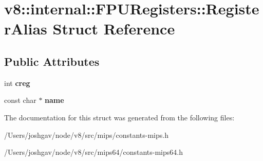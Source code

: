 \hypertarget{structv8_1_1internal_1_1_f_p_u_registers_1_1_register_alias}{}\section{v8\+:\+:internal\+:\+:F\+P\+U\+Registers\+:\+:Register\+Alias Struct Reference}
\label{structv8_1_1internal_1_1_f_p_u_registers_1_1_register_alias}
\subsection*{Public Attributes}
\begin{DoxyCompactItemize}
\item 
int {\bfseries creg}\hypertarget{structv8_1_1internal_1_1_f_p_u_registers_1_1_register_alias_aa9c6ec67f3d8b50d8832cee4fee5eda1}{}\label{structv8_1_1internal_1_1_f_p_u_registers_1_1_register_alias_aa9c6ec67f3d8b50d8832cee4fee5eda1}

\item 
const char $\ast$ {\bfseries name}\hypertarget{structv8_1_1internal_1_1_f_p_u_registers_1_1_register_alias_af7e1a4c08b94dd3b17c3311897eee432}{}\label{structv8_1_1internal_1_1_f_p_u_registers_1_1_register_alias_af7e1a4c08b94dd3b17c3311897eee432}

\end{DoxyCompactItemize}


The documentation for this struct was generated from the following files\+:\begin{DoxyCompactItemize}
\item 
/\+Users/joshgav/node/v8/src/mips/constants-\/mips.\+h\item 
/\+Users/joshgav/node/v8/src/mips64/constants-\/mips64.\+h\end{DoxyCompactItemize}
